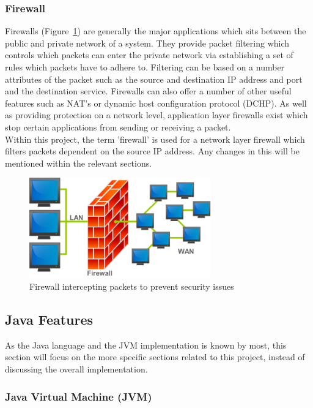 \documentclass[a4paper, titlepage]{article}
\begin{document}
\subsubsection{Firewall}
Firewalls (Figure~\ref{fig:firewall}) are generally the major applications which sits between the public and private network of a system. They provide packet filtering which controls which packets can enter the private network via establishing a set of rules which packets have to adhere to. Filtering can be based on a number attributes of the packet such as the source and destination IP address and port and the destination service. Firewalls can also offer a number of other useful features such as NAT's or dynamic host configuration protocol (DCHP). As well as providing protection on a network level, application layer firewalls exist which stop certain applications from sending or receiving a packet. \\
\newline
Within this project, the term 'firewall' is used for a network layer firewall which filters packets dependent on the source IP address. Any changes in this will be mentioned within the relevant sections. \\

\begin{figure}[H]
	\centering
	\includegraphics[width=0.7\textwidth]{images/firewall.png}
	\caption{Firewall intercepting packets to prevent security issues}
	\label{fig:firewall}
\end{figure}

\subsection{Java Features}
As the Java language and the JVM implementation is known by most, this section will focus on the more specific sections related to this project, instead of discussing the overall implementation.

\subsubsection{Java Virtual Machine (JVM)}
\end{document}
